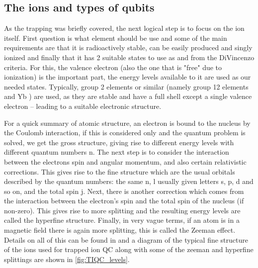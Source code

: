 \subsection{The ions and types of qubits}\label{sec:trapqbit}
As the trapping was briefly covered, the next logical step is to focus on the ion itself.
First question is what element should be use and some of the main requirements are that it is radioactively stable, can be easily produced and singly ionized and finally that it has 2 suitable states to use as \kz and \ko from the DiVincenzo criteria.
For this, the valence electron (also the one that is "free" due to ionization) is the important part, the energy levels available to it are used as our needed states.
Typically, group 2 elements or similar (namely group 12 elements and Yb \cite{ozeriTrappedionQubitTool2011}) are used, as they are stable and have a full shell except a single valence electron -- leading to a suitable electronic structure.

For a quick summary of atomic structure, an electron is bound to the nucleus by the Coulomb interaction, if this is considered only and the quantum problem is solved, we get the gross structure, giving rise to different energy levels with different quantum numbers n.
The next step is to consider the interaction between the electrons spin and angular momentum, and also certain relativistic corrections.
This gives rise to the fine structure which are the usual orbitals described by the quantum numbers: the same n, l usually given letters s, p, d and so on, and the total spin j.
Next, there is another correction which comes from the interaction between the electron's spin and the total spin of the nucleus (if non-zero).
This gives rise to more splitting and the resulting energy levels are called the hyperfine structure.
Finally, in very vague terms, if an atom is in a magnetic field there is again more splitting, this is called the Zeeman effect.
Details on all of this can be found in \cite{woodgateELEMENTARYATOMICSTRUCTURE1970} and a diagram of the typical fine structure of the ions used for trapped ion QC along with some of the zeeman and hyperfine splittings are shown in \cref{fig:TIQC_levels}.


